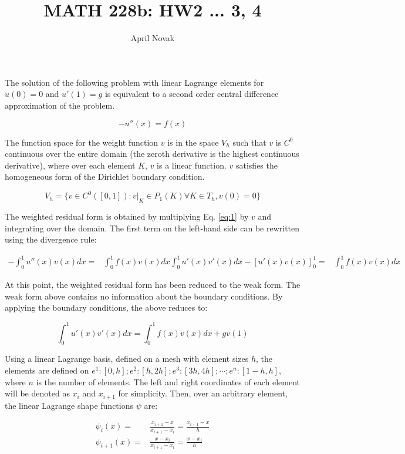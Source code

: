 \documentclass[10pt]{article}
\newcommand{\beq}{\begin{equation}}
\newcommand{\eeq}{\end{equation}}
\newcommand{\beqa}{\begin{equation}\begin{aligned}}
\newcommand{\eeqa}{\end{aligned}\end{equation}}
\begin{document}
\title{MATH 228b: HW2 ... 3, 4}
\author{April Novak}

\maketitle

\section{} 

The solution of the following problem with linear Lagrange elements for \(u(0)=0\) and \(u'(1)=g\) is equivalent to a second order central difference approximation of the problem. 

\beq
\label{eq:1}
-u''(x)=f(x)
\eeq

The function space for the weight function \(v\) is in the space \(V_h\) such that \(v\) is \(C^0\) continuous over the entire domain (the zeroth derivative is the highest continuous derivative), where over each element \(K\), \(v\) is a linear function. \(v\) satisfies the homogeneous form of the Dirichlet boundary condition.

\beq
V_h=\{v\in C^0([0,1]): v\rvert_K\in P_1(K) \forall K\in T_h, v(0)=0\}
\eeq

The weighted residual form is obtained by multiplying Eq. \eqref{eq:1} by \(v\) and integrating over the domain. The first term on the left-hand side can be rewritten using the divergence rule:

\beqa
-\int_0^1 u''(x)v(x)dx=& \int_0^1 f(x)v(x)dx
\int_0^1 u'(x)v'(x)dx-\left\lbrack u'(x)v(x)\right\rbrack_0^1=& \int_0^1 f(x)v(x)dx
\eeqa

At this point, the weighted residual form has been reduced to the weak form. The weak form above contains no information about the boundary conditions. By applying the boundary conditions, the above reduces to:

\beq
\int_0^1 u'(x)v'(x)dx=\int_0^1 f(x)v(x)dx+gv(1)
\eeq

Using a linear Lagrange basis, defined on a mesh with element sizes \(h\), the elements are defined on \(e^1: [0, h]; e^2: [h, 2h]; e^3: [3h, 4h]; \cdots; e^n: [1-h, h]\), where \(n\) is the number of elements. The left and right coordinates of each element will be denoted as \(x_i\) and \(x_{i+1}\) for simplicity. Then, over an arbitrary element, the linear Lagrange shape functions \(\psi\) are:

\beqa
\psi_i(x)=& \frac{x_{i+1}-x}{x_{i+1}-x_i}=\frac{x_{i+1}-x}{h}\\
\psi_{i+1}(x) =& \frac{x-x_i}{x_{i+1}-x_i}=\frac{x-x_i}{h}\\
\eeqa
\end{document}
